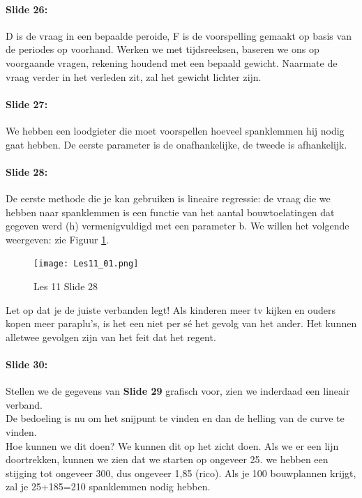 \documentclass[10pt,a4paper]{report}
\begin{document}
\paragraph{Slide 26:} D is de vraag in een bepaalde peroide, F is de voorspelling gemaakt op basis van de periodes op voorhand. Werken we met tijdsreeksen, baseren we ons op voorgaande vragen, rekening houdend met een bepaald gewicht. Naarmate de vraag verder in het verleden zit, zal het gewicht lichter zijn.

\paragraph{Slide 27:} We hebben een loodgieter die moet voorspellen hoeveel spanklemmen hij nodig gaat hebben. De eerste parameter is de onafhankelijke, de tweede is afhankelijk.

\paragraph{Slide 28:} De eerste methode die je kan gebruiken is lineaire regressie: de vraag die we hebben naar spanklemmen is een functie van het aantal bouwtoelatingen dat gegeven werd (h) vermenigvuldigd met een parameter b. We willen het volgende weergeven: zie Figuur \ref{les11_01}.\\

\begin{figure}[h!]
\centering
\texttt{[image: Les11\_01.png]}
\caption{Les 11 Slide 28} 
\label{les11_01}
\end{figure}

Let op dat je de juiste verbanden legt! Als kinderen meer tv kijken en ouders kopen meer paraplu's, is het een niet per s\'e het gevolg van het ander. Het kunnen alletwee gevolgen zijn van het feit dat het regent.

\paragraph{Slide 30:} Stellen we de gegevens van \textbf{Slide 29} grafisch voor, zien we inderdaad een lineair verband.\\
De bedoeling is nu om het snijpunt te vinden en dan de helling van de curve te vinden.\\
Hoe kunnen we dit doen? We kunnen dit op het zicht doen. Als we er een lijn doortrekken, kunnen we zien dat we starten op ongeveer 25. we hebben een stijging tot ongeveer 300, dus ongeveer 1,85 (rico). Als je 100 bouwplannen krijgt, zal je 25+185=210 spanklemmen nodig hebben.
\end{document}
